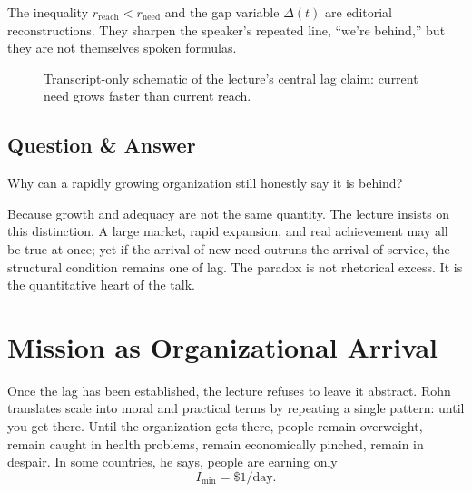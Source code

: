 \begin{remark}
The inequality \(r_{\mathrm{reach}}<r_{\mathrm{need}}\) and the gap variable \(\Delta(t)\) are editorial reconstructions. They sharpen the speaker's repeated line, ``we're behind,'' but they are not themselves spoken formulas.
\end{remark}

\begin{figure}[h]
\centering
{}
\caption{Transcript-only schematic of the lecture's central lag claim: current need grows faster than current reach.}
\end{figure}

\subsection{Question \& Answer}

Why can a rapidly growing organization still honestly say it is behind?

Because growth and adequacy are not the same quantity. The lecture insists on this distinction. A large market, rapid expansion, and real achievement may all be true at once; yet if the arrival of new need outruns the arrival of service, the structural condition remains one of lag. The paradox is not rhetorical excess. It is the quantitative heart of the talk.

\section{Mission as Organizational Arrival}

Once the lag has been established, the lecture refuses to leave it abstract. Rohn translates scale into moral and practical terms by repeating a single pattern: until you get there. Until the organization gets there, people remain overweight, remain caught in health problems, remain economically pinched, remain in despair. In some countries, he says, people are earning only
\begin{equation}
I_{\min}=\$1/\text{day}.
\end{equation}

